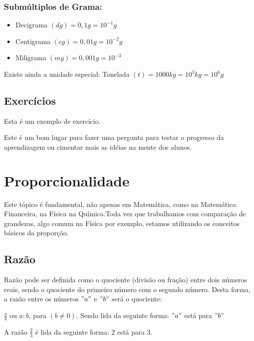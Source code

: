 \documentclass[11pt,fleqn]{book}
\begin{document}
	\subsection{Submúltiplos de Grama:}
		\begin{itemize}
		    \item Decigrama $(dg) = 0,1 g = 10^{-1} g$
		    \item Centigrama $(cg) = 0,01 g = 10^{-2} g$
		    \item Miligrama $(mg) = 0,001 g = 10^{-3}$
		\end{itemize}
Existe ainda a unidade especial:
Tonelada $(t) = 1000 kg = 10^3 kg = 10^6 g$

\section{Exercícios}

Esta é um exemplo de exercício.
	\begin{exercise}
	Este é um bom lugar para fazer uma pergunta para testar o progresso da aprendizagem ou cimentar mais as idéias na mente dos alunos.
	\end{exercise}


\chapter{Proporcionalidade}
Este tópico é fundamental, não apenas em Matemática, como na Matemática Financeira, na Física  na Química.Toda vez que trabalhamos com comparação de grandezas, algo comum na Física por exemplo, estamos utilizando os conceitos básicos da proporção.   

\section{Razão}
Razão pode ser definida como o quociente (divisão ou fração) entre dois números reais, sendo o quociente do primeiro número com o segundo número. Desta forma, a razão entre os números $"a"$ e $"b"$ será o quociente:

	\begin{center}
		$\frac{a}{b}$ ou $a:b$, para $(b \neq 0)$. 	Sendo lida da seguinte forma: 
		$"a"$ está para $"b"$
	\end{center}

	\begin{example}
	A razão $\frac{2}{3}$ é lida da seguinte forma: 2 está para 3.
	\end{example}
\end{document}
